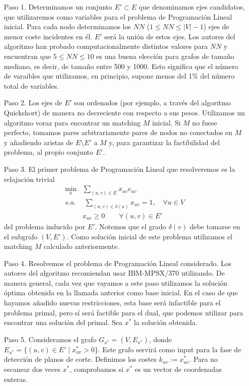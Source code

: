 \documentclass[twoside,a4paper,openright,12pt,tikz]{book}
\begin{document}
\begin{itemize}
\item[Paso 1.] Determinamos un conjunto $E'\subset E$ que denominamos ejes candidatos, que utilizaremos como variables para el problema de Programación Lineal inicial. Para cada nodo determinamos los $NN$ ($1\leq NN \leq |V|-1$) ejes de menor coste incidentes en él. $E'$ será la unión de estos ejes. Los autores del algoritmo han probado computacionalmente distintos valores para $NN$ y encuentran que $5\leq NN \leq 10$ es una buena elección para grafos de tamaño mediano, es decir, de tamaño entre 500 y 1000. Esto significa que el número de varaibles que utilizamos, en principio, supone menos del 1\% del número total de variables. 
\item[Paso 2.] Los ejes de $E'$ son ordenados (por ejemplo, a través del algoritmo Quickshort) de manera no decreciente con respecto a sus pesos. Utilizamos un algoritmo voraz para encontrar un matching $M$ inicial. Si $M$ no fuese perfecto, tomamos pares arbitrariamente pares de nodos no conectados en $M$ y añadiendo aristas de $E\setminus E'$ a $M$ y, para garantizar la factibilidad del problema, al propio conjunto $E'$. 
\item[Paso 3.] El primer problema de Programación Lineal que resolveremos es la relajación trivial 
\begin{align*}
\min_x & \sum_{(u,v) \in E}x_{uv}c_{uv}\\
s.a.&\;\sum_{(u,v)\in\delta(u)} x_{uv} = 1, \quad \forall u \in V\\
&x_{uv} \geq 0 \qquad \forall(u,v)\in E'
\end{align*}
del problema inducido por $E'$. Notemos que el grado $\delta(v)$ debe tomarse en el subgrafo $(V,E')$. Como solución inicial de este problema utilizamos el matching $M$ calculado anteriormente.
\newpage
\item[Paso 4.] Resolvemos el problema de Programación Lineal considerado. Los autores del algoritmo recomiendan usar IBM-MPSX/370 utilizando. De manera general, cada vez que vayamos a este paso utilizamos la solución óptima obtenida en la llamada anterior como base inicial. En el caso de que hayamos añadido nuevas restricciones, esta base será infactible para el problema primal, pero sí será factible para el dual, que podemos utilizar para encontrar una solución del primal. Sea $x^*$ la solución obtenida.
\item[Paso 5.] Consideramos el grafo $G_{x^*}=(V,E_{x^*})$, donde $E_{x^*} =\{(u,v)\in E'\mid x^*_{uv}>0\}$. Este grafo servirá como input para la fase de detección de planos de corte. Definimos los costes $k_{uv}:=x^*_{uv}$. Para no escanear dos veces $x^*$, comprobamos si $x^*$ es un vector de coordenadas enteras.

\end{itemize}
\end{document}

